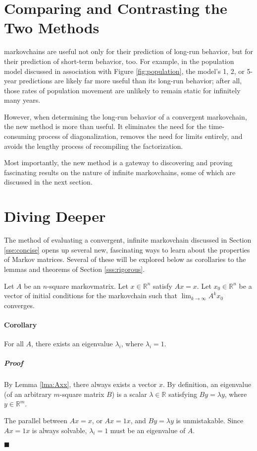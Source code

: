 \documentclass[titlepage]{article}
\newcounter{lemma}
\newcounter{theorem}
\newcounter{corollary}
\newenvironment{corollary}[2]{
    \refstepcounter{corollary}\label{#1}
    \paragraph{Corollary \thecorollary}\hangindent=15pt #2

    \setlength{\leftskip}{15pt}
    \subparagraph{\hspace{-15pt}Proof}
}{

    \setlength{\leftskip}{0pt}
    \qed
}
\newcommand{\qed}{
    \begin{flushright}
        $\blacksquare$
    \end{flushright}
}
\newcommand{\R}{\mathbb{R}}
\begin{document}
\section{Comparing and Contrasting the Two Methods}
\Glspl{markovchain} are useful not only for their prediction of long-run behavior, but for their prediction of short-term behavior, too. For example, in the population model discussed in association with Figure \ref{fig:population}, the model's 1, 2, or 5-year predictions are likely far more useful than its long-run behavior; after all, those rates of population movement are unlikely to remain static for infinitely many years.\par
However, when determining the long-run behavior of a convergent \Gls{markovchain}, the new method is more than useful. It eliminates the need for the time-consuming process of diagonalization, removes the need for limits entirely, and avoids the lengthy process of recompiling the factorization.\par
Most importantly, the new method is a gateway to discovering and proving fascinating results on the nature of infinite \Glspl{markovchain}, some of which are discussed in the next section.
\newpage



\section{Diving Deeper}
The method of evaluating a convergent, infinite \Gls{markovchain} discussed in Section \ref{sse:concise} opens up several new, fascinating ways to learn about the properties of Markov matrices. Several of these will be explored below as corollaries to the lemmas and theorems of Section \ref{sss:rigorous}.\par
Let $A$ be an $n$-square \Gls{markovmatrix}. Let $x\in\R^n$ satisfy $Ax=x$. Let $x_0\in\R^n$ be a vector of initial conditions for the \Gls{markovchain} such that $\lim_{k\to\infty}A^kx_0$ converges.

\begin{corollary}{cly:1iseigenvalue}{
    For all $A$, there exists an eigenvalue $\lambda_i$, where $\lambda_i=1$.
}
    By Lemma \ref{lma:Axx}, there always exists a vector $x$. By definition, an eigenvalue (of an arbitrary $m$-square matrix $B$) is a scalar $\lambda\in\R$ satisfying $By=\lambda y$, where $y\in\R^m$.\par
    The parallel between $Ax=x$, or $Ax=1x$, and $By=\lambda y$ is unmistakable. Since $Ax=1x$ is always solvable, $\lambda_i=1$ must be an eigenvalue of $A$.
\end{corollary}
\end{document}

